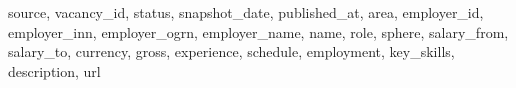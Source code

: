 source, vacancy\_id, status, snapshot\_date, published\_at, area, employer\_id, employer\_inn, employer\_ogrn, employer\_name, name, role, sphere, salary\_from, salary\_to, currency, gross, experience, schedule, employment, key\_skills, description, url
